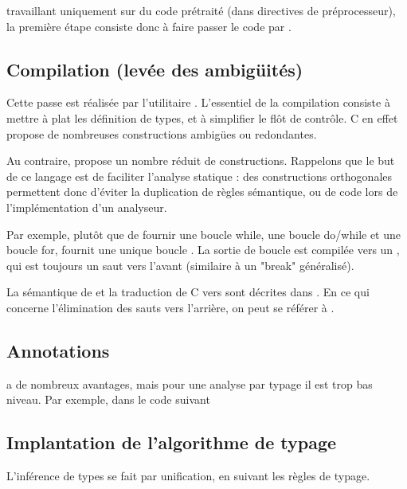 \ctonewspeak{} travaillant uniquement sur du code prétraité (dans directives de
préprocesseur), la première étape consiste donc à faire passer le code par \cpp.

\subsection{Compilation (levée des ambigüités)}

Cette passe est réalisée par l'utilitaire \ctonewspeak{}. L'essentiel de la
compilation consiste à mettre à plat les définition de types, et à simplifier le
flôt de contrôle. C en effet propose de nombreuses constructions ambigües ou
redondantes.

Au contraire, \newspeak{} propose un nombre réduit de constructions. Rappelons
que le but de ce langage est de faciliter l'analyse statique : des constructions
orthogonales permettent donc d'éviter la duplication de règles sémantique, ou de
code lors de l'implémentation d'un analyseur.

Par exemple, plutôt que de fournir une boucle while, une boucle do/while et une
boucle for, \newspeak{} fournit une unique boucle \npkWhile{}. La sortie de
boucle est compilée vers un \npkGoto{}, qui est toujours un saut vers l'avant
(similaire à un "break" généralisé).

La sémantique de \newspeak{} et la traduction de C vers \newspeak{} sont
décrites dans \cite{newspeak}. En ce qui concerne l'élimination des sauts vers
l'arrière, on peut se référer à \cite{goto}.

\subsection{Annotations}

\newspeak{} a de nombreux avantages, mais pour une analyse par typage il est
trop bas niveau. Par exemple, dans le code suivant



\subsection{Implantation de l'algorithme de typage}

L'inférence de types se fait par unification, en suivant les règles de typage.


